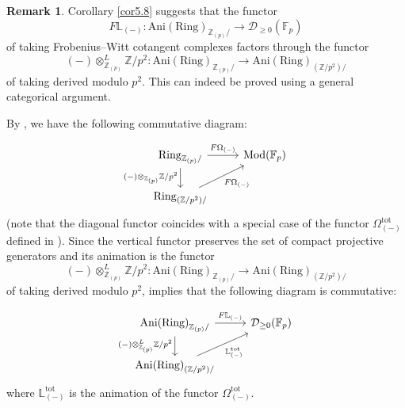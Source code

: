 \documentclass[11pt, a4paper]{amsart}
\theoremstyle{plain}
\theoremstyle{definition}
\newtheorem{remark}[theorem]{Remark}
\begin{document}
\begin{remark}
    Corollary \ref{cor5.8} suggests that the functor \[F\mathbb L_{(-)}:\operatorname{Ani(Ring)}_{\mathbb Z_{(p)}/}\to \mathcal D_{\ge0}(\mathbb F_p)\] of taking Frobenius--Witt cotangent complexes factors through the functor \[(-)\otimes^L_{\mathbb Z_{(p)}}\mathbb Z/p^2:\operatorname{Ani(Ring)}_{\mathbb Z_{(p)}/}\to \operatorname{Ani(Ring)}_{(\mathbb Z/p^2)/}\] of taking derived modulo $p^2$. This can indeed be proved using a general categorical argument. 

    By \cite[Corollary 2.4]{Sai22}, we have the following commutative diagram:

    \[ \begin{tikzcd} \operatorname{Ring}_{\mathbb Z_{(p)}/} \arrow[r, "F\Omega_{(-)}"] \arrow[d, "(-)\otimes_{\mathbb Z_{(p)}}\mathbb Z/p^2"'] & \operatorname{Mod}(\mathbb F_p) \\ \operatorname{Ring}_{(\mathbb Z/p^2)/}
    \arrow[ur, "F\Omega_{(-)}"']
    \end{tikzcd} \] 
(note that the diagonal functor coincides with a special case of the functor $\Omega_{(-)}^{\mathrm{tot}}$ defined in \cite[Paragraph 2.7]{DKRZB17}). Since the vertical functor preserves the set of compact projective generators and its animation is the functor \[(-)\otimes^L_{\mathbb Z_{(p)}}\mathbb Z/p^2:\operatorname{Ani(Ring)}_{\mathbb Z_{(p)}/}\to \operatorname{Ani(Ring)}_{(\mathbb Z/p^2)/}\] of taking derived modulo $p^2$, \cite[Proposition 5.15]{CS24} implies that the following diagram is commutative:

     \[ \begin{tikzcd} \operatorname{Ani(Ring)}_{\mathbb Z_{(p)}/} \arrow[r, "F\mathbb L_{(-)}"] \arrow[d, "(-)\otimes_{\mathbb Z_{(p)}}^L\mathbb Z/p^2"'] & \mathcal D_{\ge0}(\mathbb F_p) \\ \operatorname{Ani(Ring)}_{(\mathbb Z/p^2)/}
    \arrow[ur, "\mathbb L^{\mathrm{tot}}_{(-)}"']
    \end{tikzcd} \] 
where $\mathbb L^{\mathrm{tot}}_{(-)}$ is the animation of the functor $\Omega^{\mathrm{tot}}_{(-)}$.
    
\end{remark}
\end{document}
